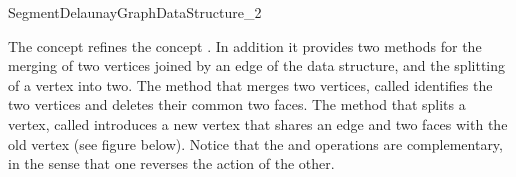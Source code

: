 


\begin{ccRefConcept}{SegmentDelaunayGraphDataStructure_2}

\ccDefinition

The concept  refines the
concept . In addition
it provides two methods for the merging of two vertices joined by an
edge of the data structure, and the splitting of a vertex into two.
The method that merges two vertices, called 
identifies the two vertices and deletes their common two faces. The
method that splits a vertex, called  introduces a
new vertex that shares an edge and two faces with the old vertex (see
figure below). Notice that the  and
 operations are complementary, in the sense that one
reverses the action of the other.


\end{ccRefConcept}

